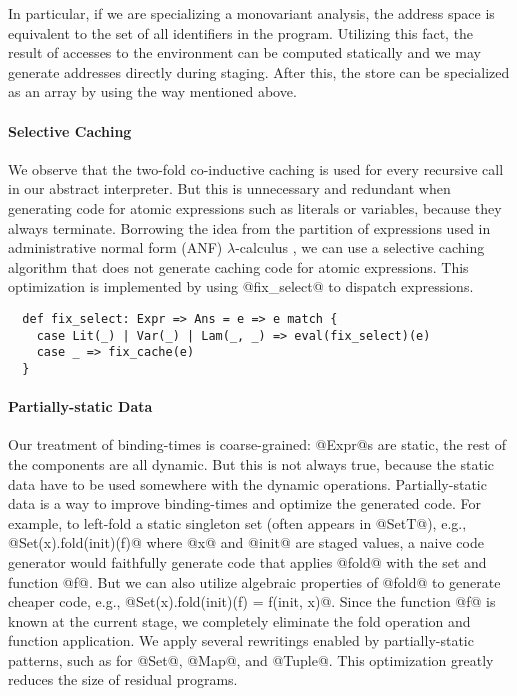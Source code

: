 In particular, if we are specializing a monovariant analysis, the address space
is equivalent to the set of all identifiers in the program. Utilizing this fact, the
result of accesses to the environment can be computed statically and we may
generate addresses directly during staging. After this, the store can be
specialized as an array by using the way mentioned above.

\paragraph{Selective Caching} We observe that the two-fold co-inductive
caching is used for every recursive call in our abstract interpreter. But this
is unnecessary and redundant when generating code for atomic
expressions such as literals or variables, because they always terminate.
Borrowing the idea from the partition of expressions used in 
administrative normal form (ANF) $\lambda$-calculus
\cite{Flanagan:1993:ECC:155090.155113}, we can use a selective caching
algorithm that does not generate caching code for atomic expressions.
This optimization is implemented by using @fix_select@ to dispatch expressions.
\begin{lstlisting}
  def fix_select: Expr => Ans = e => e match {
    case Lit(_) | Var(_) | Lam(_, _) => eval(fix_select)(e)
    case _ => fix_cache(e)
  }
\end{lstlisting}

\paragraph{Partially-static Data}
Our treatment of binding-times is coarse-grained: @Expr@s are static, the rest
of the components are all dynamic. But this is not always true, because the
static data have to be used somewhere with the dynamic operations.
Partially-static data is a way to improve binding-times and optimize the
generated code.
For example, to left-fold a static singleton set (often appears in @SetT@), e.g.,
@Set(x).fold(init)(f)@ where @x@ and @init@ are staged values, a naive code
generator would faithfully generate code that applies @fold@ with the set
and function @f@. But we can also utilize algebraic properties of @fold@
to generate cheaper code, e.g., @Set(x).fold(init)(f) = f(init, x)@. Since the
function @f@ is known at the current stage, we completely eliminate the fold
operation and function application. We apply several rewritings enabled by
partially-static patterns, such as for @Set@, @Map@, and @Tuple@. This
optimization greatly reduces the size of residual programs.

